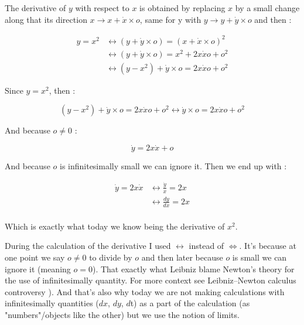 \documentclass[12pt]{article}
\begin{document}
The derivative of $y$ with respect to $x$ is obtained by replacing $x$ by a small change along that its direction $x \rightarrow x + \dot{x} \times o$, same for y with $y \rightarrow y + \dot{y} \times o$ and then :

\begin{equation*}
    \begin{split}
        y = x^2 & \leftrightarrow  (y + \dot{y} \times o) = (x + \dot{x} \times o)^2 \\
            & \leftrightarrow  (y + \dot{y} \times o) = x^2 +2x\dot{x}o + o^2 \\
            & \leftrightarrow  (y - x^2) + \dot{y} \times o = 2x\dot{x}o + o^2
    \end{split}
\end{equation*}

Since $y=x^2$, then :

$$
(y - x^2) + \dot{y} \times o = 2x\dot{x}o + o^2  \leftrightarrow \dot{y} \times o = 2x\dot{x}o + o^2 
$$

And because $o \neq 0$ : 


$$
\dot{y} = 2x\dot{x} + o
$$

And because $o$ is infinitesimally small we can ignore it. Then we end up with :

\begin{equation*}
    \begin{split}
        \dot{y} = 2x\dot{x} & \leftrightarrow \frac{\dot{y}}{\dot{x}} = 2x\\
                            & \leftrightarrow \frac{dy}{dx} = 2x\\
    \end{split}
\end{equation*}

Which is exactly what today we know being the derivative of $x^2$.

During the calculation of the derivative I used $\leftrightarrow$ instead of $\Leftrightarrow$. It's because at one point we say $o \neq 0$ to divide by $o$ and then later because $o$ is small we can ignore it (meaning $o=0$). That exactly what Leibniz blame Newton's theory \cite{wiki_history_of_calculus} for the use of infinitesimally quantity. For more context see Leibniz–Newton calculus controversy \cite{wiki_newton_calculus_controversy}). And that's also why today we are not making calculations with infinitesimally quantities ($dx$, $dy$, $d$t) as a part of the calculation (as "numbers"/objects like the other) but we use the notion of limits.
\end{document}
